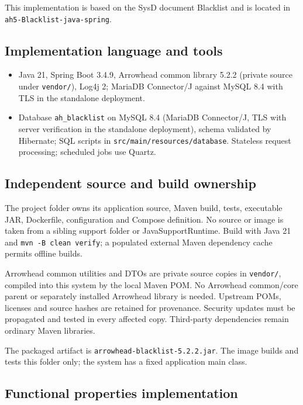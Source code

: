 \documentclass[a4paper]{arrowhead}
\begin{document}
This implementation is based on the SysD document Blacklist \cite{bl-sysd} and is located in \texttt{ah5-Blacklist-java-spring}.

\subsection{Implementation language and tools}
\begin{itemize}
\item Java 21, Spring Boot 3.4.9, Arrowhead common library 5.2.2 (private source under \texttt{vendor/}), Log4j 2; MariaDB Connector/J against MySQL 8.4 with TLS in the standalone deployment.
\item Database \texttt{ah\_\allowbreak{}blacklist} on MySQL 8.4 (MariaDB Connector/J, TLS with server verification in the standalone deployment), schema validated by Hibernate; SQL scripts in \texttt{src/\allowbreak{}main/\allowbreak{}resources/\allowbreak{}database}. Stateless request processing; scheduled jobs use Quartz.
\end{itemize}

\subsection{Independent source and build ownership}
The project folder owns its application source, Maven build, tests, executable JAR, Dockerfile, configuration and Compose definition. No source or image is taken from a sibling support folder or JavaSupportRuntime. Build with Java 21 and \texttt{mvn -B clean verify}; a populated external Maven dependency cache permits offline builds.

Arrowhead common utilities and DTOs are private source copies in \texttt{vendor/}, compiled into this system by the local Maven POM. No Arrowhead common/core parent or separately installed Arrowhead library is needed. Upstream POMs, licenses and source hashes are retained for provenance. Security updates must be propagated and tested in every affected copy. Third-party dependencies remain ordinary Maven libraries.

The packaged artifact is \texttt{arrowhead-\allowbreak{}blacklist-5.2.2.jar}. The image builds and tests this folder only; the system has a fixed application main class.

\subsection{Functional properties implementation}
\end{document}
